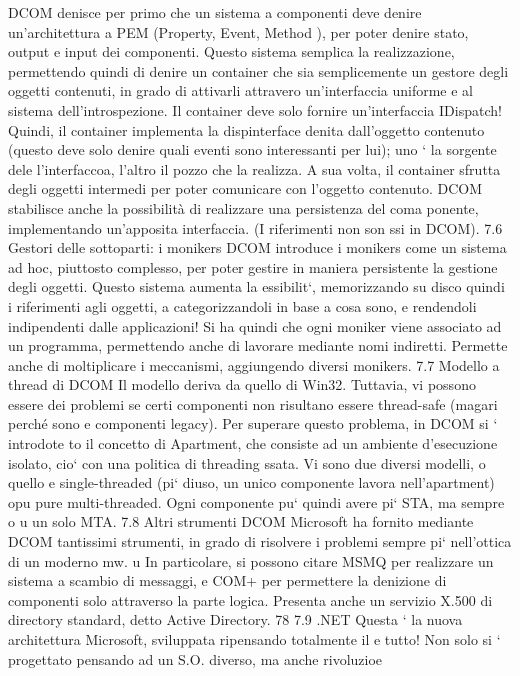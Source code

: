 \documentclass[a4paper,12pt]{article}
\begin{document}
DCOM denisce per primo che un sistema a componenti deve denire un'architettura a PEM (Property, Event, Method ), per
poter denire stato, output
e input dei componenti. Questo sistema semplica la realizzazione, permettendo quindi di denire un container che sia
semplicemente un gestore degli oggetti
contenuti, in grado di attivarli attravero un'interfaccia uniforme e al sistema dell'introspezione. Il container deve
solo fornire un'interfaccia IDispatch! Quindi,
il container implementa la dispinterface denita dall'oggetto contenuto (questo
deve solo denire quali eventi sono interessanti per lui); uno ` la sorgente dele
l'interfaccoa, l'altro il pozzo che la realizza. A sua volta, il container sfrutta
degli oggetti intermedi per poter comunicare con l'oggetto contenuto.
DCOM stabilisce anche la possibilità di realizzare una persistenza del coma
ponente, implementando un'apposita interfaccia. (I riferimenti non son ssi in
DCOM).
7.6
Gestori delle sottoparti: i monikers
DCOM introduce i monikers come un sistema ad hoc, piuttosto complesso, per
poter gestire in maniera persistente la gestione degli oggetti. Questo sistema
aumenta la essibilit`, memorizzando su disco quindi i riferimenti agli oggetti,
a
categorizzandoli in base a cosa sono, e rendendoli indipendenti dalle applicazioni!
Si ha quindi che ogni moniker viene associato ad un programma, permettendo
anche di lavorare mediante nomi indiretti. Permette anche di moltiplicare i
meccanismi, aggiungendo diversi monikers.
7.7
Modello a thread di DCOM
Il modello deriva da quello di Win32. Tuttavia, vi possono essere dei problemi se certi componenti non risultano essere
thread-safe (magari perché sono
e
componenti legacy). Per superare questo problema, in DCOM si ` introdote
to il concetto di Apartment, che consiste ad un ambiente d'esecuzione isolato,
cio` con una politica di threading ssata. Vi sono due diversi modelli, o quello
e
single-threaded (pi` diuso, un unico componente lavora nell'apartment) opu
pure multi-threaded. Ogni componente pu` quindi avere pi` STA, ma sempre
o
u
un solo MTA.
7.8
Altri strumenti DCOM
Microsoft ha fornito mediante DCOM tantissimi strumenti, in grado di risolvere
i problemi sempre pi` nell'ottica di un moderno mw.
u
In particolare, si possono citare MSMQ per realizzare un sistema a scambio di
messaggi, e COM+ per permettere la denizione di componenti solo attraverso
la parte logica. Presenta anche un servizio X.500 di directory standard, detto
Active Directory.
78
7.9
.NET
Questa ` la nuova architettura Microsoft, sviluppata ripensando totalmente il
e
tutto! Non solo si ` progettato pensando ad un S.O. diverso, ma anche rivoluzioe
\end{document}
